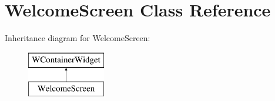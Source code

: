 \hypertarget{classWelcomeScreen}{}\section{Welcome\+Screen Class Reference}
\label{classWelcomeScreen}
Inheritance diagram for Welcome\+Screen\+:\begin{figure}[H]
\begin{center}
\leavevmode
\includegraphics[height=2.000000cm]{classWelcomeScreen}
\end{center}
\end{figure}
